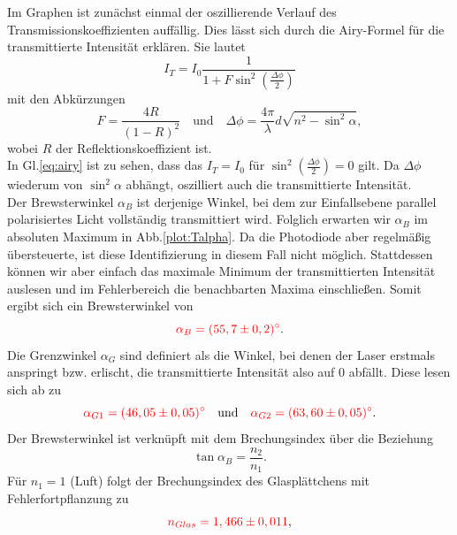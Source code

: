 Im Graphen ist zunächst einmal der oszillierende Verlauf des Transmissionskoeffizienten auffällig. Dies lässt sich durch die Airy-Formel für die transmittierte Intensität 
erklären. Sie lautet 
\begin{equation}
    I_T = I_0 \frac{1}{1+F \sin^2(\frac{\Delta \phi}{2})}  
    \label{eq:airy}
\end{equation}
mit den Abkürzungen 
\begin{equation}
    F = \frac{4R}{(1-R)^2} \quad \mathrm{ und } \quad \Delta \phi = \frac{4\pi}{\lambda}d\sqrt{n^2-\sin^2\alpha},
    \label{eq:airyPar}
\end{equation} 
wobei $R$ der Reflektionskoeffizient ist.\\
In Gl.\ref{eq:airy} ist zu sehen, dass das $I_T = I_0$ für $\sin^2(\frac{\Delta \phi}{2}) = 0$ gilt. Da $\Delta \phi$ wiederum von $\sin^2\alpha$ abhängt, oszilliert auch die 
transmittierte Intensität.\\
Der Brewsterwinkel $\alpha_B$ ist derjenige Winkel, bei dem zur Einfallsebene parallel polarisiertes Licht vollständig transmittiert wird. Folglich erwarten wir $\alpha_B$ 
im absoluten Maximum in Abb.\ref{plot:Talpha}. Da die Photodiode aber regelmäßig übersteuerte, ist diese Identifizierung in diesem Fall nicht möglich. Stattdessen können wir 
aber einfach das maximale Minimum der transmittierten Intensität auslesen und im Fehlerbereich die benachbarten Maxima einschließen. Somit ergibt sich ein Brewsterwinkel von 
\begin{equation*}
    \textcolor{red}{\alpha_B = (55,7 \pm 0,2)^\circ}.
\end{equation*}
Die Grenzwinkel $\alpha_G$ sind definiert als die Winkel, bei denen der Laser erstmals anspringt bzw. erlischt, die transmittierte Intensität also auf 0 abfällt. Diese lesen sich 
ab zu 
\begin{equation*}
    \textcolor{red}{\alpha_{G1} = (46,05 \pm 0,05)^\circ \quad} \mathrm{ und } \textcolor{red}{ \quad \alpha_{G2} = (63,60 \pm 0,05)^\circ}.
\end{equation*}
Der Brewsterwinkel ist verknüpft mit dem Brechungsindex über die Beziehung 
\begin{equation*}
    \tan\alpha_B = \frac{n_2}{n_1}.
\end{equation*}
Für $n_1 = 1$ (Luft) folgt der Brechungsindex des Glasplättchens mit Fehlerfortpflanzung zu 
\begin{equation*}
    \textcolor{red}{n_{Glas} = 1,466 \pm 0,011},
\end{equation*}
